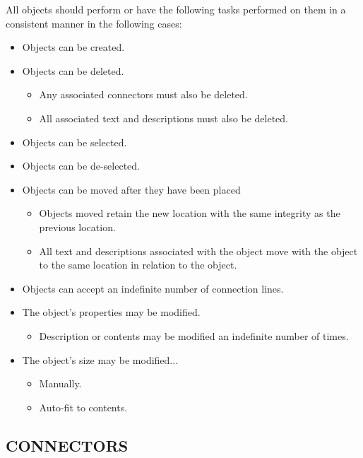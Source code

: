 \documentclass[twoside,letterpaper]{article}
\begin{document}
All objects should perform or have the following tasks performed on them in a consistent manner in the following cases: 
\begin{itemize}
	\item Objects can be created.
	\item Objects can be deleted.
\begin{itemize}
\item Any associated connectors must also be deleted.
\item All associated text and descriptions must also be deleted.
\end{itemize}
	\item Objects can be selected.
	\item Objects can be de-selected.
	\item Objects can be moved after they have been placed
\begin{itemize}
\item Objects moved retain the new location with the same integrity as the previous location.
\item All text and descriptions associated with the object move with the object to the same location in relation to the object.
\end{itemize}
\item Objects can accept an indefinite number of connection lines.
	\item The object's properties may be modified.
\begin{itemize}
\item Description or contents may be modified an indefinite number of times.
\end{itemize}
	\item The object's size may be modified...
	\begin{itemize}
		\item Manually.
		\item Auto-fit to contents.
\end{itemize}
\end{itemize}

\bigskip

\subsection[CONNECTORS]{\bfseries CONNECTORS}
\end{document}

